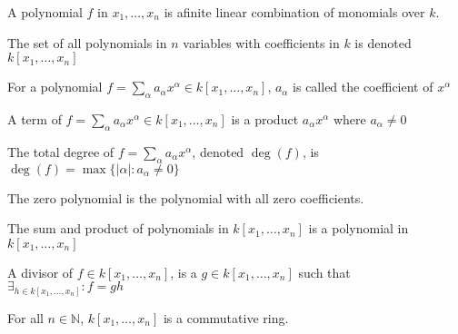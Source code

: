 \documentclass[crop=false,class=article,oneside]{standalone}
\begin{document}
            \begin{definition}
                A polynomial $f$ in $x_1,\hdots, x_n$
                is afinite linear combination of
                monomials over $k$.
            \end{definition}
            \begin{notation}
                The set of all polynomials in $n$
                variables with coefficients in $k$ is
                denoted $k[x_1,\hdots ,x_n]$
            \end{notation}
            \begin{definition}
                For a polynomial
                $f=\sum_{\alpha}%
                   a_{\alpha}x^{\alpha}%
                   \in{k}[x_1,\hdots ,x_n]$,
                $a_\alpha$ is called the
                coefficient of $x^{\alpha}$
            \end{definition}
            \begin{definition}
                A term of
                $f=\sum_{\alpha}a_{\alpha}x^{\alpha}%
                   \in k[x_1,\hdots ,x_n]$ is a product
                $a_{\alpha}x^{\alpha}$ where
                $a_{\alpha}\ne{0}$
            \end{definition}
            \begin{definition}
                The total degree of
                $f=\sum_{\alpha}a_\alpha x^\alpha$,
                denoted $\deg(f)$, is
                $\deg(f)=\max\{|\alpha|:a_\alpha\ne{0}\}$
            \end{definition}
            \begin{definition}
                The zero polynomial is the
                polynomial with all zero coefficients.
            \end{definition}
            \begin{theorem}
                The sum and product of polynomials in
                $k[x_1,\hdots ,x_n]$ is a polynomial
                in $k[x_1,\hdots,x_n]$
            \end{theorem}
            \begin{definition}
                A divisor of $f\in k[x_{1},\hdots,x_{n}]$,
                is a $g\in k[x_{1},\hdots,x_{n}]$ such that
                $\exists_{h\in k[x_{1},\hdots,x_{n}]}:f=gh$
            \end{definition}
            \begin{theorem}
                For all $n\in\mathbb{N}$,
                $k[x_1,\hdots ,x_n]$ is a commutative ring.
            \end{theorem}
\end{document}
